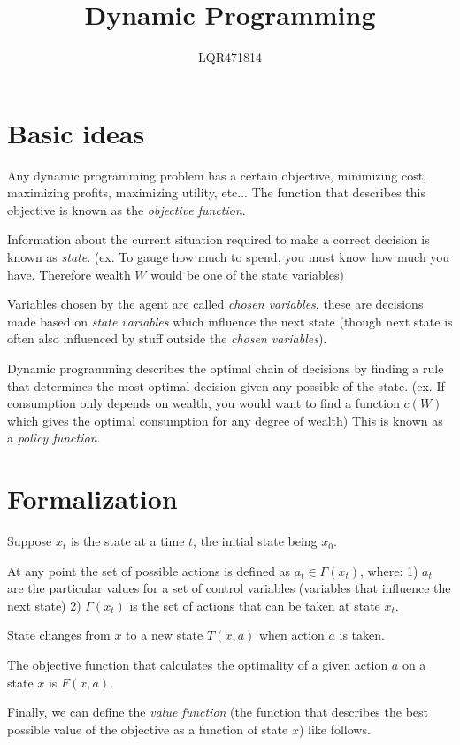 \documentclass[a4paper, 12pt]{article}
\begin{document}
\title{Dynamic Programming}
\author{LQR471814}
\maketitle

\section{Basic ideas}

Any dynamic programming problem has a certain objective, minimizing cost, maximizing profits, maximizing utility, etc... The function that describes this objective is known as the \emph{objective function}.

Information about the current situation required to make a correct decision is known as \emph{state}. (ex. To gauge how much to spend, you must know how much you have. Therefore wealth $W$ would be one of the state variables)

Variables chosen by the agent are called \emph{chosen variables}, these are decisions made based on \emph{state variables} which influence the next state (though next state is often also influenced by stuff outside the \emph{chosen variables}).

Dynamic programming describes the optimal chain of decisions by finding a rule that determines the most optimal decision given any possible of the state. (ex. If consumption only depends on wealth, you would want to find a function $c(W)$ which gives the optimal consumption for any degree of wealth) This is known as a \emph{policy function}.

\section{Formalization}

Suppose $x_{t}$ is the state at a time $t$, the initial state being $x_{0}$.

At any point the set of possible actions is defined as $a_{t} \in \Gamma(x_{t})$, where: 1) $a_{t}$ are the particular values for a set of control variables (variables that influence the next state) 2) $\Gamma(x_{t})$ is the set of actions that can be taken at state $x_{t}$.

State changes from $x$ to a new state $T(x, a)$ when action $a$ is taken.

The objective function that calculates the optimality of a given action $a$ on a state $x$ is $F(x, a)$.

Finally, we can define the \emph{value function} (the function that describes the best possible value of the objective as a function of state $x$) like follows.
\end{document}
